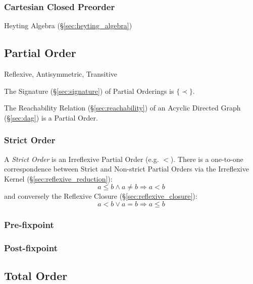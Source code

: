 \subsubsection{Cartesian Closed Preorder}\label{sec:cartesian_preorder}

Heyting Algebra (\S\ref{sec:heyting_algebra})



\subsection{Partial Order}\label{sec:partial_order}

Reflexive, Antisymmetric, Transitive

The Signature (\S\ref{sec:signature}) of Partial Orderings is
$\{\prec\}$.

The Reachability Relation (\S\ref{sec:reachability}) of an Acyclic
Directed Graph (\S\ref{sec:dag}) is a Partial Order.



\subsubsection{Strict Order}\label{sec:strict_order}

A \emph{Strict Order} is an Irreflexive Partial Order (e.g. $<$).
There is a one-to-one correspondence between Strict and Non-strict
Partial Orders via the Irreflexive Kernel
(\S\ref{sec:reflexive_reduction}):
\[
  a \leq b \wedge a \neq b \Rightarrow a < b
\]
and conversely the Reflexive Closure (\S\ref{sec:reflexive_closure}):
\[
  a < b \vee a = b \Rightarrow a \leq b
\]



\subsubsection{Pre-fixpoint}\label{sec:prefixpoint}

\subsubsection{Post-fixpoint}\label{sec:postfixpoint}



\subsection{Total Order}\label{sec:total_order}

